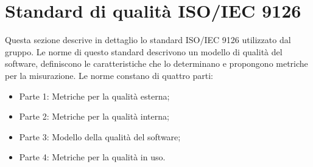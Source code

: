 \section{Standard di qualità ISO/IEC 9126}
Questa sezione descrive in dettaglio lo standard ISO/IEC 9126 utilizzato dal gruppo. Le norme di questo standard descrivono un modello di qualità del software, definiscono le caratteristiche che lo determinano e propongono metriche per la misurazione.
Le norme constano di quattro parti:
\begin{itemize}
\item Parte 1: Metriche per la qualità esterna;
\item Parte 2: Metriche per la qualità interna;
\item Parte 3: Modello della qualità del software;
\item Parte 4: Metriche per la qualità in uso.
\end{itemize}





